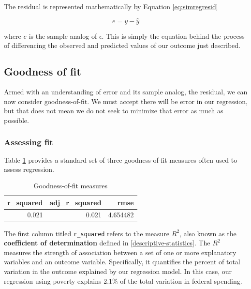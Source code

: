 \documentclass[
]{book}
\begin{document}
The residual is represented mathematically by Equation \eqref{eq:simregresid}

\begin{equation}
e = y - \hat{y}
\label{eq:simregresid}
\end{equation}

where \(e\) is the sample analog of \(\epsilon\). This is simply the equation behind the process of differencing the observed and predicted values of our outcome just described.

\hypertarget{goodness-of-fit}{%
\subsection{Goodness of fit}\label{goodness-of-fit}}

Armed with an understanding of error and its sample analog, the residual, we can now consider goodness-of-fit. We must accept there will be error in our regression, but that does not mean we do not seek to minimize that error as much as possible.

\hypertarget{assessing-fit}{%
\subsubsection*{Assessing fit}\label{assessing-fit}}

Table \ref{tab:simregexfit} provides a standard set of three goodness-of-fit measures often used to assess regression.

\begin{table}

\caption{\label{tab:simregexfit}Goodness-of-fit measures}
\centering
\begin{tabular}[t]{r|r|r}
\hline
r\_squared & adj\_r\_squared & rmse\\
\hline
0.021 & 0.021 & 4.654482\\
\hline
\end{tabular}
\end{table}

The first column titled \texttt{r\_squared} refers to the measure \(R^2\), also known as the \textbf{coefficient of determination} defined in \ref{descriptive-statistics}. The \(R^2\) measures the strength of association between a set of one or more explanatory variables and an outcome variable. Specifically, it quantifies the percent of total variation in the outcome explained by our regression model. In this case, our regression using poverty explains 2.1\% of the total variation in federal spending.
\end{document}
